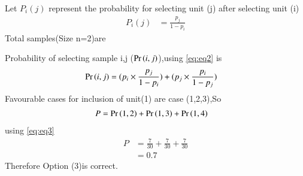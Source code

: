 \documentclass[journal,12pt,twocolumn]{IEEEtran}
\begin{document}
Let $P_{i}(j)$ represent the probability for selecting unit (j) after selecting  unit (i) 
\begin{align}
    P_{i}(j)&=\frac{p_{j}}{1-p_{i}}
    \label{eq:eq2}
\end{align}
Total samples(Size n=2)are 

\begin{table}[h!]
  \caption{ list of samples}
  \label{tab:label1_test}
\end{table}
Probability of selecting sample i,j ($\Pr\left(i,j\right)$),using \eqref{eq:eq2} is 
\begin{align}
    \Pr\left(i,j\right)&=(p_{i}\times \frac{p_{j}}{1-p_{i}}) + (p_{j}\times \frac{p_{i}}{1-p_{j}}) 
    \label{eq:eq3}
\end{align}
Favourable cases for inclusion of unit(1) are case (1,2,3),So
\begin{align}
    P&=\Pr\left(1,2\right) +\Pr\left(1,3\right)+\Pr\left(1,4\right)
\end{align}
using \eqref{eq:eq3}
\begin{align}
    P&=\frac{7}{30} + \frac{7}{30} + \frac{7}{30}
    \\
    &=0.7
\end{align}
Therefore Option (3)is correct.
\end{document}
